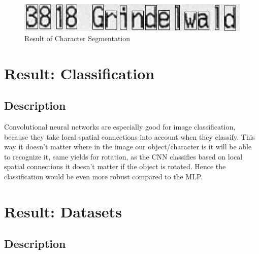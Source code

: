 \documentclass[Report.tex]{subfiles}
\begin{document}
\begin{figure}[H]
  \centering
  \includegraphics[width=12cm]{res/segment_letter}
  \caption{Result of Character Segmentation}
  \label{fig:Character_segmentation}
\end{figure}

\section{Result: Classification}

\subsection{Description}
\begin{flushleft}
  Convolutional neural networks are especially good for image
  classification, because they take local spatial connections into account when
  they classify. This way it doesn't matter where in the image our
  object/character is it will be able to recognize it, same yields for rotation,
  as the CNN classifies based on local spatial connections it doesn't matter if
  the object is rotated. Hence the classification would be even more robust
  compared to the MLP.
\end{flushleft}

\section{Result: Datasets}
\subsection{Description}
\end{document}
